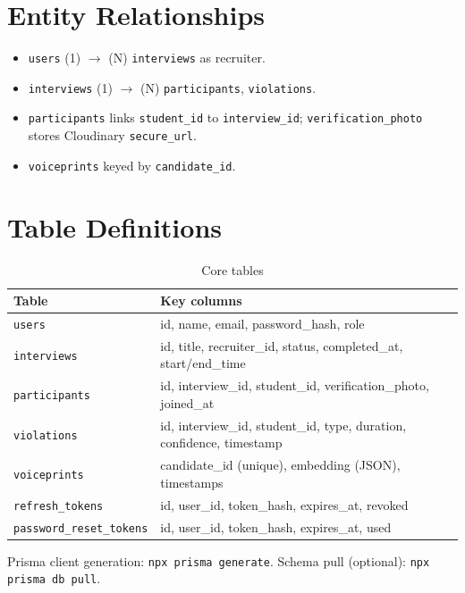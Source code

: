 \documentclass[11pt,a4paper]{report}
\begin{document}
\section{Entity Relationships}
\begin{itemize}
  \item \texttt{users} (1) $\rightarrow$ (N) \texttt{interviews} as recruiter.
  \item \texttt{interviews} (1) $\rightarrow$ (N) \texttt{participants}, \texttt{violations}.
  \item \texttt{participants} links \texttt{student\_id} to \texttt{interview\_id}; \texttt{verification\_photo} stores Cloudinary \texttt{secure\_url}.
  \item \texttt{voiceprints} keyed by \texttt{candidate\_id}.
\end{itemize}

\section{Table Definitions}

\begin{table}[H]
\centering
\small
\caption{Core tables}
\begin{tabularx}{\textwidth}{@{}lX@{}}
\toprule
\textbf{Table} & \textbf{Key columns} \\
\midrule
\texttt{users} & id, name, email, password\_hash, role \\
\texttt{interviews} & id, title, recruiter\_id, status, completed\_at, start/end\_time \\
\texttt{participants} & id, interview\_id, student\_id, verification\_photo, joined\_at \\
\texttt{violations} & id, interview\_id, student\_id, type, duration, confidence, timestamp \\
\texttt{voiceprints} & candidate\_id (unique), embedding (JSON), timestamps \\
\texttt{refresh\_tokens} & id, user\_id, token\_hash, expires\_at, revoked \\
\texttt{password\_reset\_tokens} & id, user\_id, token\_hash, expires\_at, used \\
\bottomrule
\end{tabularx}
\end{table}

Prisma client generation: \texttt{npx prisma generate}. Schema pull (optional): \texttt{npx prisma db pull}.

\end{document}
